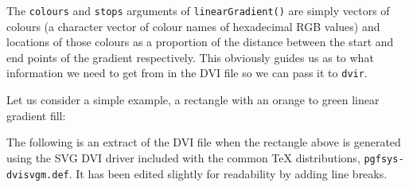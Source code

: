 \documentclass[]{article}
\begin{document}
The \texttt{colours} and \texttt{stops} arguments of
\texttt{linearGradient()} are simply vectors of colours (a character
vector of colour names of hexadecimal RGB values) and locations of those
colours as a proportion of the distance between the start and end points
of the gradient respectively. This obviously guides us as to what
information we need to get from \Tikz{} in the DVI file so we can pass
it to \texttt{dvir}.

Let us consider a simple example, a rectangle with an orange to green
linear gradient fill:

\begin{figure}
\centering
{}
\end{figure}

The following is an extract of the DVI file when the rectangle above is
generated using the SVG DVI driver included with the common \TeX{}
distributions, \texttt{pgfsys-dvisvgm.def}. It has been edited slightly
for readability by adding line breaks.
\end{document}
